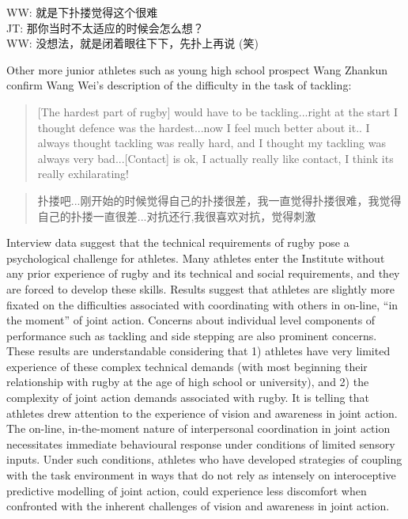 \begin{CJK}{UTF8}{gbsn}
\begin{Quotation}
  WW: 就是下扑搂觉得这个很难 \\
  JT: 那你当时不太适应的时候会怎么想？\\
  WW: 没想法，就是闭着眼往下下，先扑上再说 (笑)
\end{Quotation}


Other more junior athletes such as young high school prospect Wang Zhankun confirm Wang Wei's description of the difficulty in the task of tackling:

\begin{quotation}
  [The hardest part of rugby] would have to be tackling...right at the start I thought defence was the hardest...now I feel much better about it.. I always thought tackling was really hard, and I thought my tackling was always very bad...[Contact] is ok, I actually really like contact, I think its really exhilarating!
\end{quotation}

\begin{quotation}
  扑搂吧...刚开始的时候觉得自己的扑搂很差，我一直觉得扑搂很难，我觉得自己的扑搂一直很差...对抗还行,我很喜欢对抗，觉得刺激
\end{quotation}

Interview data suggest that the technical requirements of rugby pose a psychological challenge for athletes.  Many athletes enter the Institute without any prior experience of rugby and its technical and social requirements, and they are forced to develop these skills.  Results suggest that athletes are slightly more fixated on the difficulties associated with coordinating with others in on-line, ``in the moment'' of joint action.  Concerns about individual level components of performance such as tackling and side stepping are also prominent concerns.  These results are understandable considering that 1) athletes have very limited experience of these complex technical demands (with most beginning their relationship with rugby at the age of high school or university), and 2) the complexity of joint action demands associated with rugby.  It is telling that athletes drew attention to the experience of vision and awareness in joint action.  The on-line, in-the-moment nature of interpersonal coordination in joint action necessitates immediate behavioural response under conditions of limited sensory inputs.  Under such conditions, athletes who have developed strategies of coupling with the task environment in ways that do not rely as intensely on interoceptive predictive modelling of joint action, could experience less discomfort when confronted with the inherent challenges of vision and awareness in joint action.



\end{CJK}
